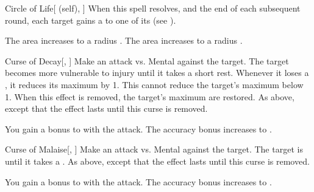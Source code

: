 \lowercase{\hypertarget{spell:Circle of Life}{}}\label{spell:Circle of Life}
\begin{attuneability}[Rank 3]{\hypertarget{spell:Circle of Life}{Circle of Life}}[ (self), ]
When this spell resolves, and the end of each subsequent round, each target gains a   to one of its  (see ).

\rankline
{} The area increases to a \arealarge radius .
 The area increases to a \areahuge radius .
\end{attuneability}
\vspace{0.25em}



\lowercase{\hypertarget{spell:Curse of Decay}{}}\label{spell:Curse of Decay}
\begin{freeability}[Rank 3]{\hypertarget{spell:Curse of Decay}{Curse of Decay}}[, ]
Make an attack vs. Mental against the target.
\hit The target becomes more vulnerable to injury until it takes a short rest.
Whenever it loses a , it reduces its maximum  by 1.
This cannot reduce the target's maximum  below 1.
When this effect is removed, the target's maximum  are restored.
\crit As above, except that the effect lasts until this curse is removed.

\rankline
{} You gain a  bonus to  with the attack.
 The accuracy bonus increases to .
\end{freeability}
\vspace{0.25em}



\lowercase{\hypertarget{spell:Curse of Malaise}{}}\label{spell:Curse of Malaise}
\begin{freeability}[Rank 3]{\hypertarget{spell:Curse of Malaise}{Curse of Malaise}}[, ]
Make an attack vs. Mental against the target.
\hit The target is  until it takes a .
\crit As above, except that the effect lasts until this curse is removed.

\rankline
{} You gain a  bonus to  with the attack.
 The accuracy bonus increases to .
\end{freeability}
\vspace{0.25em}



